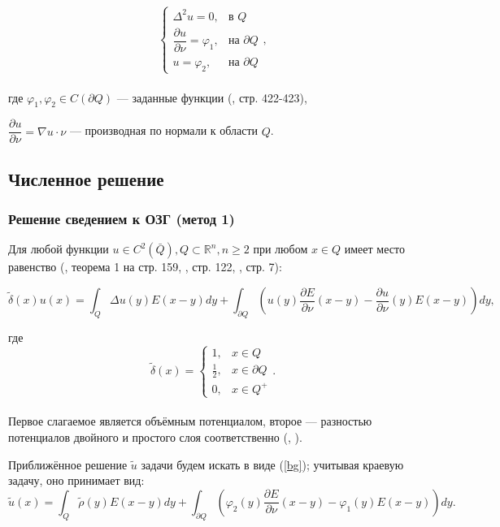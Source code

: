 \documentclass[a4paper]{article}
\newcommand{\R}[1]{\mathbb{R}^#1}
\newcommand{\der}[2]{\dfrac{\partial #1}{\partial #2}}
\begin{document}
\[
  \begin{cases}
    \Delta^2 u=0,           & \text{в $Q$}           \\
    \der{u}{\nu}=\varphi_1, & \text{на $\partial Q$} \\
    u=\varphi_2,            & \text{на $\partial Q$}
  \end{cases},
\]
\\
где 
$\varphi_1, \varphi_2 \in C(\partial Q) $ --- заданные функции (\cite{samar}, стр. 422-423),

$\der{u}{\nu}=\nabla u \cdot \nu$ --- производная по нормали к области $Q$.

\subsection{Численное решение}
\subsubsection{Решение сведением к ОЗГ (метод 1)}
Для любой функции $u \in C^2(\bar Q), Q \subset \R{n}, n \geq 2$
при любом $x \in Q$ имеет место равенство (\cite{mich}, теорема 1 на стр. 159, \cite{lezh}, стр. 122, \cite{lezh2}, стр. 7):

\begin{equation}
  \tilde{\delta}(x) u(x)= \int_Q \Delta u(y) E(x-y) dy + \int_{\partial Q} \left(u(y)\der{E}{\nu}(x-y)-\der{u}{\nu}(y) E(x-y) \right) dy,
  \label{bg}
\end{equation}

где
\\
\[
  \tilde{\delta}(x) =
  \begin{cases}
    1,           & x \in Q          \\
    \frac{1}{2}, & x \in \partial Q \\
    0,           & x \in Q^+
  \end{cases}.
\]
\\
Первое слагаемое является объёмным потенциалом, второе --- разностью потенциалов двойного и простого слоя соответственно (\cite{agosh}, \cite{vlad}).

Приближённое решение $\tilde{u}$ задачи будем искать в виде (\ref{bg}); учитывая краевую задачу, оно принимает вид:
\begin{equation}
  \tilde{u}(x)= \int_Q \tilde{\rho}(y) E(x-y) dy + \int_{\partial Q} \left(\varphi_2(y)\der{E}{\nu}(x-y)-\varphi_1(y) E(x-y) \right) dy.
  \label{u1}
\end{equation}
\end{document}
